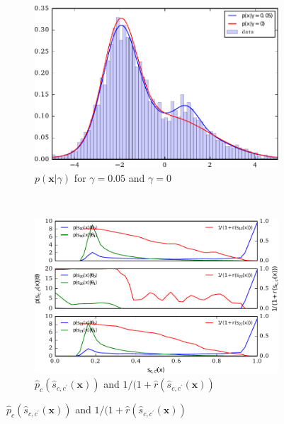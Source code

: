 \documentclass[12pt]{article}
\numberwithin{equation}{section}
\theoremstyle{plain}
\begin{document}
\begin{figure}
    \centering
    \begin{subfigure}[b]{0.4\textwidth}
        \includegraphics[width=\textwidth]{figures/fig1a.pdf}
        \caption{$p(\mathbf{x}|\gamma)$  for $\gamma=0.05$ and $\gamma=0$}
        \label{fig:1a}
    \end{subfigure}
    ~ %
    \begin{subfigure}[b]{0.4\textwidth}
        \includegraphics[width=\textwidth]{figures/fig-p_sij.pdf}
        \caption{$\hat{p}_c(\hat{s}_{c,c^\prime}(\mathbf{x}) )$ and $1/(1+\hat{r}(\hat{s}_{c,c^\prime}(\mathbf{x}))$}
        \label{fig:p_sij}
    \end{subfigure}



\end{figure}
\end{document}
